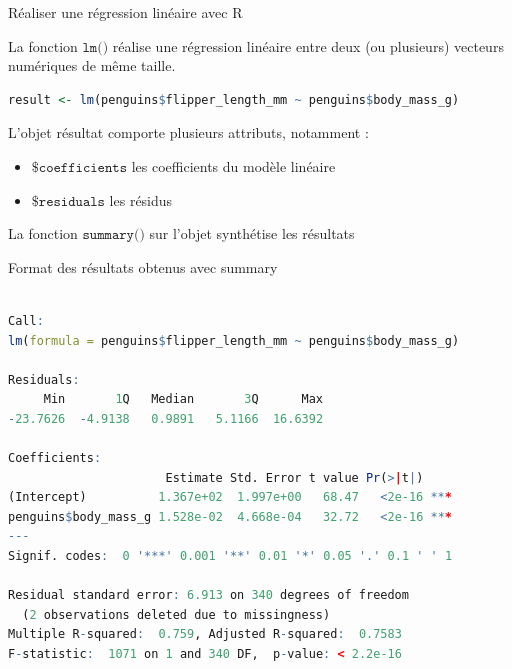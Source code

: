 \documentclass{beamer}
\begin{document}
\begin{frame}[fragile]{Réaliser une régression linéaire avec R}


La fonction $\texttt{lm()}$ réalise une régression linéaire entre deux (ou plusieurs) vecteurs numériques de même taille.

\vspace{0.5cm}

\begin{small}
\begin{spacing}{0.75}
\begin{lstlisting}[language=R,basicstyle=\scriptsize\ttfamily, commentstyle=\ttfamily]
 result <- lm(penguins$flipper_length_mm ~ penguins$body_mass_g)
\end{lstlisting}
\end{spacing}
\end{small}



L'objet résultat comporte plusieurs attributs, notamment : 

\begin{itemize}
  \item $\texttt{\$coefficients}$ les coefficients du modèle linéaire
  \item  $\texttt{\$residuals}$ les résidus 
\end{itemize}


La fonction $\texttt{summary()}$ sur l'objet synthétise les résultats 


\end{frame}



\begin{frame}[fragile]{Format des résultats obtenus avec summary}



\begin{tiny}
\begin{spacing}{0.75}
\begin{lstlisting}[language=R,basicstyle=\scriptsize\ttfamily, commentstyle=\ttfamily]

Call:
lm(formula = penguins$flipper_length_mm ~ penguins$body_mass_g)

Residuals:
     Min       1Q   Median       3Q      Max 
-23.7626  -4.9138   0.9891   5.1166  16.6392 

Coefficients:
                      Estimate Std. Error t value Pr(>|t|)    
(Intercept)          1.367e+02  1.997e+00   68.47   <2e-16 ***
penguins$body_mass_g 1.528e-02  4.668e-04   32.72   <2e-16 ***
---
Signif. codes:  0 '***' 0.001 '**' 0.01 '*' 0.05 '.' 0.1 ' ' 1

Residual standard error: 6.913 on 340 degrees of freedom
  (2 observations deleted due to missingness)
Multiple R-squared:  0.759,	Adjusted R-squared:  0.7583 
F-statistic:  1071 on 1 and 340 DF,  p-value: < 2.2e-16
\end{lstlisting}
\end{spacing}
\end{tiny}


\end{frame}
\end{document}
